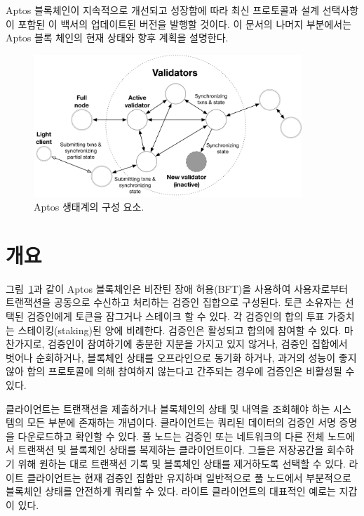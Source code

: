 \documentclass{article}
\begin{document}
Aptos 블록체인이 지속적으로 개선되고 성장함에 따라 최신 프로토콜과 설계 선택사항이 포함된 이 백서의 업데이트된 버전을 발행할 것이다. 이 문서의 나머지 부분에서는 Aptos 블록 체인의 현재 상태와 향후 계획을 설명한다.

\begin{figure}
\centering
\includegraphics[width=0.9\textwidth]{validators.pdf}
\caption{\label{fig:aptos_ecosystem}Aptos 생태계의 구성 요소.}
\end{figure}

\section{개요}
\label{sec:overview}

그림~\ref{fig:aptos_ecosystem}과 같이 Aptos 블록체인은 비잔틴 장애 허용(BFT)을 사용하여 사용자로부터 트랜잭션을 공동으로 수신하고 처리하는 검증인 집합으로 구성된다. 토큰 소유자는 선택된 검증인에게 토큰을 잠그거나 스테이크 할 수 있다. 각 검증인의 합의 투표 가중치는 스테이킹(staking)된 양에 비례한다. 검증인은 활성되고 합의에 참여할 수 있다. 마찬가지로, 검증인이 참여하기에 충분한 지분을 가지고 있지 않거나, 검증인 집합에서 벗어나 순회하거나, 블록체인 상태를 오프라인으로 동기화 하거나, 과거의 성능이 좋지 않아 합의 프로토콜에 의해 참여하지 않는다고 간주되는 경우에 검증인은 비활성될 수 있다.

클라이언트는 트랜잭션을 제출하거나 블록체인의 상태 및 내역을 조회해야 하는 시스템의 모든 부분에 존재하는 개념이다. 클라이언트는 쿼리된 데이터의 검증인 서명 증명을 다운로드하고 확인할 수 있다. 풀 노드는 검증인 또는 네트워크의 다른 전체 노드에서 트랜잭션 및 블록체인 상태를 복제하는 클라이언트이다. 그들은 저장공간을 회수하기 위해 원하는 대로 트랜잭션 기록 및 블록체인 상태를 제거하도록 선택할 수 있다. 라이트 클라이언트는 현재 검증인 집합만 유지하며 일반적으로 풀 노드에서 부분적으로 블록체인 상태를 안전하게 쿼리할 수 있다. 라이트 클라이언트의 대표적인 예로는 지갑이 있다.
\end{document}
